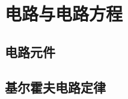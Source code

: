 

\section{电路与电路方程}\label{17-2}

\subsection{电路元件}\label{17-2-1}

\subsection{基尔霍夫电路定律}\label{17-2-2}

